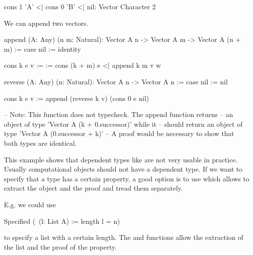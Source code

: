 \begin{alba}
    cons 1 'A' <| cons 0 'B' <| nil: Vector Character 2
\end{alba}


We can append two vectors.

\begin{alba}
    append
        (A: Any) (n m: Natural):
        Vector A n -> Vector A m -> Vector A (n + m)
    :=
        case
            nil :=
                identity

            cons k e v :=
                \w :=
                    cons (k + m) e <| append k m v w
\end{alba}


\begin{alba}
    reverse (A: Any) (n: Natural): Vector A n -> Vector A n
    :=
        case
            nil :=
                nil

            cons k e v :=
                append
                    (reverse k v)
                    (cons 0 e nil)

    -- Note: This function does not typecheck. The append function returns
    --       an object of type 'Vector A (k + 0.successor)' while it
    --       should return an object of type 'Vector A (0.successor + k)'
    -- A proof would be necessary to show that both types are identical.
\end{alba}


This example shows that dependent types like  are not very usable
in practice. Usually computational objects should not have a dependent type. If
we want to specify that a type has a certain property, a good option is to use
 which allows to extract the object and the proof and tread them
separately.

\noindent E.g. we could use
\begin{alba}
    Specified (\ (l: List A) := length l = n)
\end{alba}
%
to specify a list with a certain length. The  and 
functions allow the extraction of the list and the proof of the property.

















